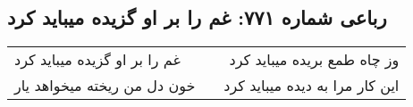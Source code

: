 \begin{center}
\section*{رباعی شماره ۷۷۱: غم را بر او گزیده میباید کرد}
\label{sec:0771}
\begin{longtable}{l p{0.5cm} r}
غم را بر او گزیده میباید کرد
&&
وز چاه طمع بریده میباید کرد
\\
خون دل من ریخته میخواهد یار
&&
این کار مرا به دیده میباید کرد
\\
\end{longtable}
\end{center}
